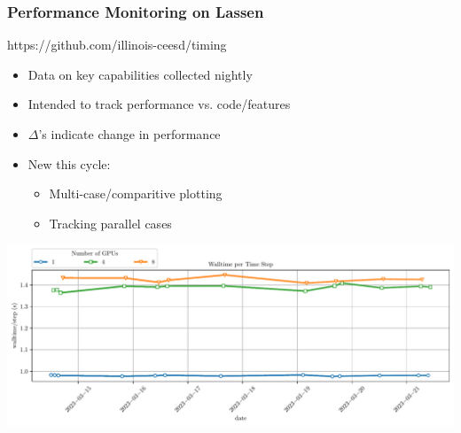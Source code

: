 \begin{frame}\frametitle{Performance Monitoring on Lassen}
\begin{minipage}[t][0.3\textheight][t]{\textwidth}
\begin{center}
https://github.com/illinois-ceesd/timing
\end{center}
\begin{multicols}{2}
\begin{itemize}
\item Data on key capabilities collected nightly
\item Intended to track performance vs. code/features
\item $\Delta$'s indicate change in performance
\columnbreak
\item New this cycle:
\begin{itemize}
\item Multi-case/comparitive plotting
\item Tracking parallel cases
\end{itemize}
\end{itemize}
\end{multicols}
\end{minipage}\vfill
\begin{center}
  \includegraphics[width=.8\textwidth]{Figures/mtc/prediction-scaling-tracking.pdf}
\end{center}
\end{frame}

